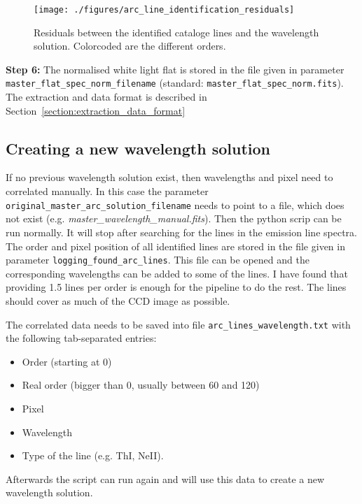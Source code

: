 \documentclass[10pt,a4paper]{article}
\begin{document}
\begin{figure} 
  \begin{center}
    \texttt{[image: ./figures/arc\_line\_identification\_residuals]}
  \end{center} 
  \caption{Residuals between the identified cataloge lines and the wavelength solution. Colorcoded are the different orders.
    \label{figure_arc_line_identification_residuals}}
\end{figure}

\vspace{0.5em}\noindent \textbf{Step 6:} The normalised white light flat is stored in the file given in parameter \verb|master_flat_spec_norm_filename| (standard: \verb|master_flat_spec_norm.fits|). The extraction and data format is described in Section~\ref{section:extraction_data_format}

\subsection{Creating a new wavelength solution}
\label{section:create_new_wave_solution}
If no previous wavelength solution exist, then wavelengths and pixel need to correlated manually. In this case the parameter \verb|original_master_arc_solution_filename| needs to point to a file, which does not exist (e.g. \textit{master\_wavelength\_manual.fits}). Then the python scrip can be run normally. It will stop after searching for the lines in the emission line spectra. The order and pixel position of all identified lines are stored in the file given in parameter \verb|logging_found_arc_lines|. This file can be opened and the corresponding wavelengths can be added to some of the lines. I have found that providing 1.5 lines per order is enough for the pipeline to do the rest. The lines should cover as much of the CCD image as possible.

The correlated data needs to be saved into file \verb|arc_lines_wavelength.txt| with the following tab-separated entries:
\begin{itemize}
  \item Order (starting at 0)
  \item Real order (bigger than 0, usually between 60 and 120)
  \item Pixel
  \item Wavelength
  \item Type of the line (e.g. ThI, NeII).
\end{itemize}

Afterwards the script can run again and will use this data to create a new wavelength solution.
\end{document}
